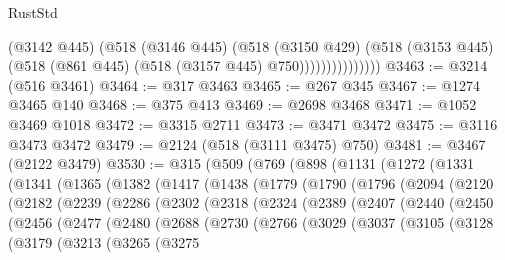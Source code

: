 \begin{lexlean}{RustStd}
\begin{coremodule}
                        (@3142 @445)
                        (@518
                          (@3146 @445)
                          (@518
                            (@3150 @429)
                            (@518
                              (@3153 @445)
                              (@518 (@861 @445) (@518 (@3157 @445) @750)))))))))))))))
@3463 := @3214 (@516 @3461)
@3464 := @317 @3463
@3465 := @267 @345
@3467 := @1274 @3465 @140
@3468 := @375 @413
@3469 := @2698 @3468
@3471 := @1052 @3469 @1018
@3472 := @3315 @2711
@3473 := @3471 @3472
@3475 := @3116 @3473 @3472
@3479 := @2124 (@518 (@3111 @3475) @750)
@3481 := @3467 (@2122 @3479)
@3530 := @315
    (@509
      (@769
        (@898
          (@1131
            (@1272
              (@1331
                (@1341
                  (@1365
                    (@1382
                      (@1417
                        (@1438
                          (@1779
                            (@1790
                              (@1796
                                (@2094
                                  (@2120
                                    (@2182
                                      (@2239
                                        (@2286
                                          (@2302
                                            (@2318
                                              (@2324
                                                (@2389
                                                  (@2407
                                                    (@2440
                                                      (@2450
                                                        (@2456
                                                          (@2477
                                                            (@2480
                                                              (@2688
                                                                (@2730
                                                                  (@2766
                                                                    (@3029
                                                                      (@3037
                                                                        (@3105
                                                                          (@3128
                                                                            (@3179
                                                                              (@3213
                                                                                (@3265
                                                                                  (@3275

\end{coremodule}
\end{lexlean}
